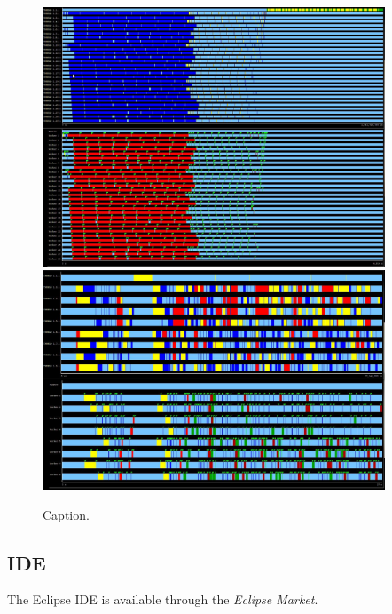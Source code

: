 \begin{figure}[ht!]
  \centering
    \includegraphics[width=0.91\textwidth]{./Sections/4_Tools/Figures/16.jpeg}
    \includegraphics[width=0.91\textwidth]{./Sections/4_Tools/Figures/16_2.jpeg}
    \caption{Caption.}
\end{figure}


\subsection{IDE}
\label{subsec:IDE}
The Eclipse IDE is available through the \textit{Eclipse Market}.